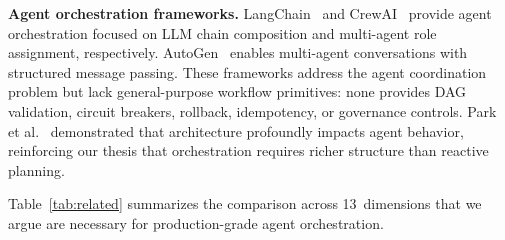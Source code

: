 \documentclass[10pt, twocolumn]{article}
\begin{document}
\textbf{Agent orchestration frameworks.} LangChain~\cite{langchain} and CrewAI~\cite{crewai} provide agent orchestration focused on LLM chain composition and multi-agent role assignment, respectively. AutoGen~\cite{autogen} enables multi-agent conversations with structured message passing. These frameworks address the agent coordination problem but lack general-purpose workflow primitives: none provides DAG validation, circuit breakers, rollback, idempotency, or governance controls. Park et al.~\cite{park2023generative} demonstrated that architecture profoundly impacts agent behavior, reinforcing our thesis that orchestration requires richer structure than reactive planning.

Table~\ref{tab:related} summarizes the comparison across 13~dimensions that we argue are necessary for production-grade agent orchestration.
\end{document}
